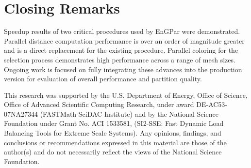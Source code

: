\documentclass[graybox]{svmult}
\begin{document}
\section{Closing Remarks} \label{sec:closing}
Speedup results of two critical procedures used by EnGPar were demonstrated.
Parallel distance computation performance is over an order of magnitude greater
and is a direct replacement for the existing procedure.
Parallel coloring for the selection process demonstrates high performance
across a range of mesh sizes.
Ongoing work is focused on fully integrating these advances into the production
version for evaluation of overall performance and partition quality.

\begin{acknowledgement}
This research was supported by the U.S. Department of Energy, Office of Science,
Office of Advanced Scientific Computing Research, under award DE-AC53-07NA27344
(FASTMath SciDAC Institute) and by the National Science Foundation under Grant
No. ACI 1533581, (SI2-SSE: Fast Dynamic Load Balancing Tools for Extreme Scale
Systems).
Any opinions, findings, and conclusions or recommendations expressed in this
material are those of the author(s) and do not necessarily reflect the views
of the National Science Foundation.
\end{acknowledgement}



\end{document}
